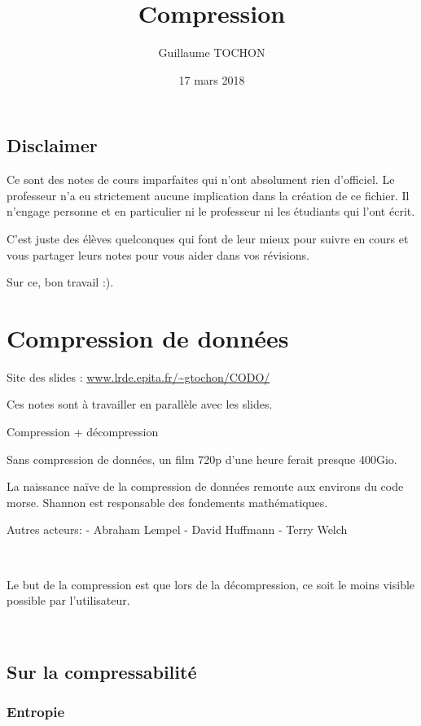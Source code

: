 \documentclass[a4paper,11pt]{article}
\title{Compression}
\author{Guillaume TOCHON}
\date{17 mars 2018}
\begin{document}
\maketitle

\subsection*{Disclaimer}

Ce sont des notes de cours imparfaites qui n'ont absolument rien d'officiel.
Le professeur n'a eu strictement aucune implication dans la création de ce
fichier. Il n'engage personne et en particulier ni le professeur ni les
étudiants qui l'ont écrit.

C'est juste des élèves quelconques qui font de leur mieux pour suivre en cours
et vous partager leurs notes pour vous aider dans vos révisions.

Sur ce, bon travail :).

\tableofcontents
\newpage
\section{Compression de données}

Site des slides : \url{www.lrde.epita.fr/~gtochon/CODO/}

Ces notes sont à travailler en parallèle avec les slides.

Compression + décompression

Sans compression de données, un film 720p d'une heure ferait presque 400Gio.

La naissance naïve de la compression de données remonte aux environs du code
morse.
Shannon est responsable des fondements mathématiques.

Autres acteurs:
  - Abraham Lempel
  - David Huffmann
  - Terry Welch

\

Le but de la compression est que lors de la décompression, ce soit le moins
visible possible par l'utilisateur.

\

\subsection{Sur la compressabilité}

\subsubsection{Entropie}
\end{document}
